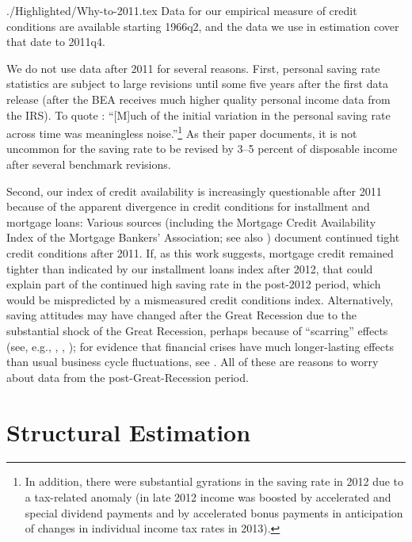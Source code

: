 \documentclass[titlepage]{\econtex}
\begin{document}
\hypertarget{Why-to-2011}{}
\begin{verbatimwrite}{./Highlighted/Why-to-2011.tex}
Data for our empirical measure of credit conditions are available starting 1966q2, and the data we use in estimation cover that date to 2011q4.

We do not use data after 2011 for several reasons. First, personal saving rate statistics are subject to large revisions until some five years  after the first data release (after the BEA receives much higher quality personal income data from the IRS).  To quote \cite{nsSavingRevisions}: ``[M]uch of the initial variation in the personal saving rate across time was meaningless noise.''\footnote{In addition, there were substantial gyrations in the saving rate in 2012 due to a tax-related anomaly (in late 2012 income was boosted by accelerated and special dividend payments and by accelerated bonus payments in anticipation of changes in individual income tax rates in 2013).} As  their paper documents, it is not uncommon for the saving rate to be revised by 3--5 percent of disposable income after several benchmark revisions.

Second, our index of credit availability is increasingly questionable after 2011 because of the apparent divergence in credit conditions for installment and mortgage loans: Various sources (including the Mortgage Credit Availability Index of the Mortgage Bankers' Association; see also \cite{bhutta_mortgageDebt}) document continued tight credit conditions after 2011.  If, as this work suggests, mortgage credit remained tighter than indicated by our installment loans index after 2012, that could explain part of the continued high saving rate in the post-2012 period, which would be mispredicted by a mismeasured credit conditions index.  Alternatively, saving attitudes may have changed after the Great Recession due to the substantial shock of the Great Recession, perhaps because of ``scarring'' effects  (see, e.g., \cite{malmendierSheng}, \cite{jstLeveragedBubbles}, \cite{hallQuantifying}); for evidence that financial crises have much longer-lasting effects than usual business cycle fluctuations, see \cite{rrAftermath}.  All of these are reasons to worry about data from the post-Great-Recession period.
\end{verbatimwrite}


\section{Structural Estimation} \label{sStructuralEstimation}
\end{document}
